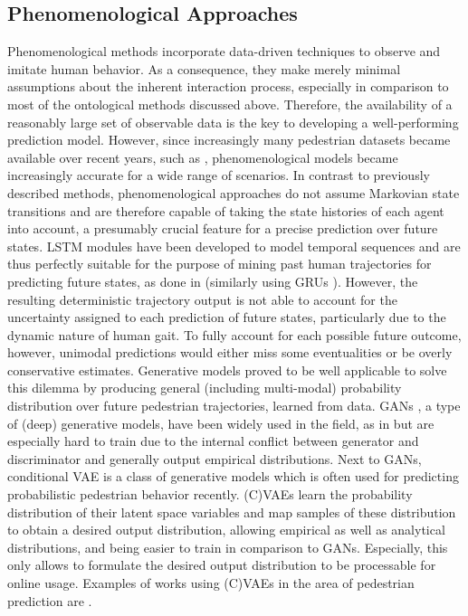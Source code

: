 \subsection{Phenomenological Approaches}
Phenomenological methods incorporate data-driven techniques to observe and imitate human behavior. As a consequence, they make merely minimal assumptions about the inherent interaction process, especially in comparison to most of the ontological methods discussed above. Therefore, the availability of a reasonably large set of observable data is the key to developing a well-performing prediction model. However, since increasingly many pedestrian datasets became available over recent years, such as \cite{Pellegrini2009}\cite{Rasouli2019}\cite{Caesar2020}, phenomenological models became increasingly accurate for a wide range of scenarios. 
\newline
In contrast to previously described methods, phenomenological approaches do not assume Markovian state transitions and are therefore capable of taking the state histories of each agent into account, a presumably crucial feature for a precise prediction over future states. \ac{LSTM} modules \cite{Hochreiter1997} have been developed to model temporal sequences and are thus perfectly suitable for the purpose of mining past human trajectories for predicting future states, as done in \cite{Chen2019a}\cite{Hug2018}\cite{Zhang2019}\cite{Jain2016} (similarly using GRUs \cite{Liu2020}). However, the resulting deterministic trajectory output is not able to account for the uncertainty assigned to each prediction of future states, particularly due to the dynamic nature of human gait. To fully account for each possible future outcome, however, unimodal predictions would either miss some eventualities or be overly conservative estimates. 
\newline
Generative models proved to be well applicable to solve this dilemma by producing general (including multi-modal) probability distribution over future pedestrian trajectories, learned from data. \ac{GAN}s \cite{Goodfellow2014}, a type of (deep) generative models, have been widely used in the field, as in \cite{Gupta2018}\cite{Kosaraju2019}\cite{Ouyang2018} but are especially hard to train due to the internal conflict between generator and discriminator and generally output empirical distributions. Next to \ac{GAN}s, conditional \ac{VAE} is a class of generative models which is often used for predicting probabilistic pedestrian behavior recently. (C)\ac{VAE}s learn the probability distribution of their latent space variables and map samples of these distribution to obtain a desired output distribution, allowing empirical as well as analytical distributions, and being easier to train in comparison to \ac{GAN}s. Especially, this only allows to formulate the desired output distribution to be processable for online usage. Examples of works using (C)\ac{VAE}s in the area of pedestrian prediction are \cite{Ivanovic2018}\cite{Salzmann2020}\cite{Poibrenski2020}\cite{Lee2017}.

